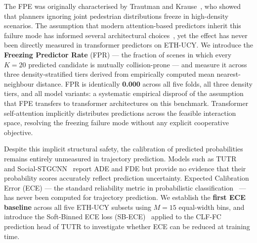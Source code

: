\documentclass{article}
\begin{document}
The FPE was originally characterised by Trautman and
Krause~\cite{trautman2010unfreezing}, who showed that planners ignoring
joint pedestrian distributions freeze in high-density scenarios.
The assumption that modern attention-based predictors inherit this failure
mode has informed several architectural
choices~\cite{mohamed2020social,shi2023tutr}, yet the effect has never
been directly measured in transformer predictors on ETH-UCY.
We introduce the \textbf{Freezing Predictor Rate} (FPR) --- the fraction
of scenes in which every $K{=}20$ predicted candidate is mutually
collision-prone --- and measure it across three density-stratified tiers
derived from empirically computed mean nearest-neighbour distance.
FPR is identically \textbf{0.000} across all five folds, all three
density tiers, and all model variants: a systematic empirical disproof of
the assumption that FPE transfers to transformer architectures on this
benchmark.
Transformer self-attention implicitly distributes predictions across the
feasible interaction space, resolving the freezing failure mode without
any explicit cooperative objective.

Despite this implicit structural safety, the calibration of predicted
probabilities remains entirely unmeasured in trajectory prediction.
Models such as TUTR~\cite{shi2023tutr} and
Social-STGCNN~\cite{mohamed2020social} report ADE and FDE but provide
no evidence that their probability scores accurately reflect prediction
uncertainty.
Expected Calibration Error (ECE) --- the standard reliability metric in
probabilistic classification~\cite{karandikar2021soft} --- has never
been computed for trajectory prediction.
We establish the \textbf{first ECE baseline} across all five ETH-UCY
subsets using $M{=}15$ equal-width bins, and introduce the Soft-Binned
ECE loss (SB-ECE)~\cite{karandikar2021soft} applied to the CLF-FC
prediction head of TUTR to investigate whether ECE can be reduced at
training time.
\end{document}
